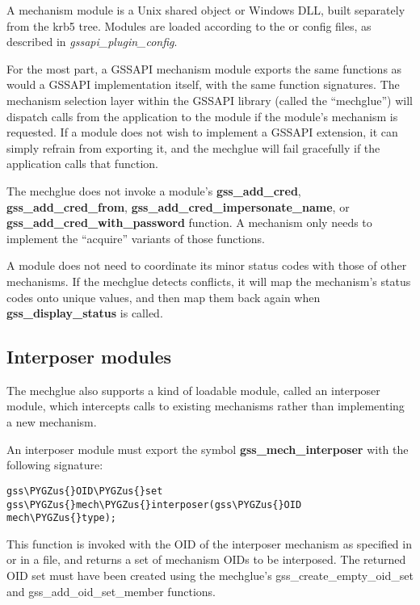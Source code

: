 \documentclass[letterpaper,10pt,english]{sphinxmanual}
\def\PYGZus{\char`\_}
\begin{document}
A mechanism module is a Unix shared object or Windows DLL, built
separately from the krb5 tree.  Modules are loaded according to the
 or  config files, as
described in \emph{gssapi\_plugin\_config}.

For the most part, a GSSAPI mechanism module exports the same
functions as would a GSSAPI implementation itself, with the same
function signatures.  The mechanism selection layer within the GSSAPI
library (called the ``mechglue'') will dispatch calls from the
application to the module if the module's mechanism is requested.  If
a module does not wish to implement a GSSAPI extension, it can simply
refrain from exporting it, and the mechglue will fail gracefully if
the application calls that function.

The mechglue does not invoke a module's \textbf{gss\_add\_cred},
\textbf{gss\_add\_cred\_from}, \textbf{gss\_add\_cred\_impersonate\_name}, or
\textbf{gss\_add\_cred\_with\_password} function.  A mechanism only needs to
implement the ``acquire'' variants of those functions.

A module does not need to coordinate its minor status codes with those
of other mechanisms.  If the mechglue detects conflicts, it will map
the mechanism's status codes onto unique values, and then map them
back again when \textbf{gss\_display\_status} is called.


\subsection{Interposer modules}
\label{plugindev/gssapi:interposer-modules}
The mechglue also supports a kind of loadable module, called an
interposer module, which intercepts calls to existing mechanisms
rather than implementing a new mechanism.

An interposer module must export the symbol \textbf{gss\_mech\_interposer}
with the following signature:

\begin{Verbatim}[commandchars=\\\{\}]
gss\PYGZus{}OID\PYGZus{}set gss\PYGZus{}mech\PYGZus{}interposer(gss\PYGZus{}OID mech\PYGZus{}type);
\end{Verbatim}

This function is invoked with the OID of the interposer mechanism as
specified in  or in a 
file, and returns a set of mechanism OIDs to be interposed.  The
returned OID set must have been created using the mechglue's
gss\_create\_empty\_oid\_set and gss\_add\_oid\_set\_member functions.
\end{document}
